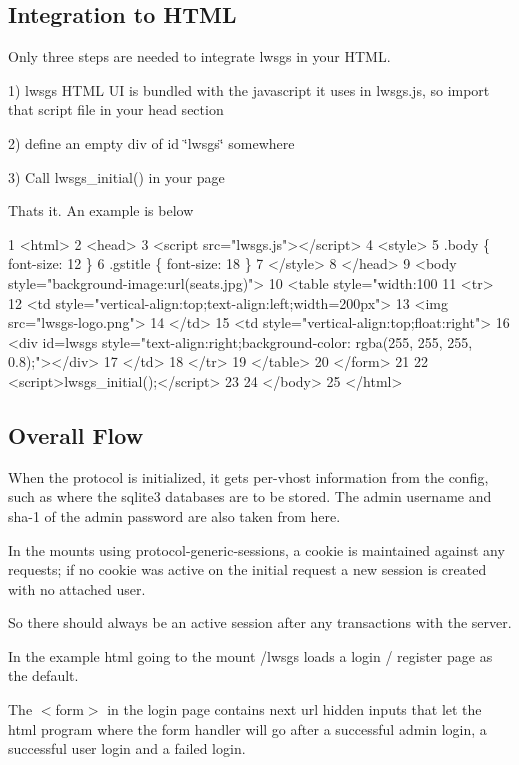 \subsection*{Integration to H\+T\+ML }

Only three steps are needed to integrate lwsgs in your H\+T\+ML.

1) lwsgs H\+T\+ML UI is bundled with the javascript it uses in {\ttfamily lwsgs.\+js}, so import that script file in your head section

2) define an empty div of id \char`\"{}lwsgs\char`\"{} somewhere

3) Call lwsgs\+\_\+initial() in your page

That\textquotesingle{}s it. An example is below


\begin{DoxyCode}
1 <html>
2  <head>
3   <script src="lwsgs.js"></script>
4   <style>
5      .body \{ font-size: 12 \}
6      .gstitle \{ font-size: 18 \}
7   </style>
8   </head>
9   <body style="background-image:url(seats.jpg)">
10     <table style="width:100%
11      <tr>
12       <td style="vertical-align:top;text-align:left;width=200px">
13        <img src="lwsgs-logo.png">
14       </td>
15       <td style="vertical-align:top;float:right">
16         <div id=lwsgs style="text-align:right;background-color: rgba(255, 255, 255, 0.8);"></div>
17       </td>
18      </tr>
19     </table>
20    </form>
21 
22    <script>lwsgs\_initial();</script>
23 
24  </body>
25 </html>
\end{DoxyCode}
 \subsection*{Overall Flow }

When the protocol is initialized, it gets per-\/vhost information from the config, such as where the sqlite3 databases are to be stored. The admin username and sha-\/1 of the admin password are also taken from here.

In the mounts using protocol-\/generic-\/sessions, a cookie is maintained against any requests; if no cookie was active on the initial request a new session is created with no attached user.

So there should always be an active session after any transactions with the server.

In the example html going to the mount /lwsgs loads a login / register page as the default.

The $<$form$>$ in the login page contains \textquotesingle{}next url\textquotesingle{} hidden inputs that let the html \textquotesingle{}program\textquotesingle{} where the form handler will go after a successful admin login, a successful user login and a failed login.

